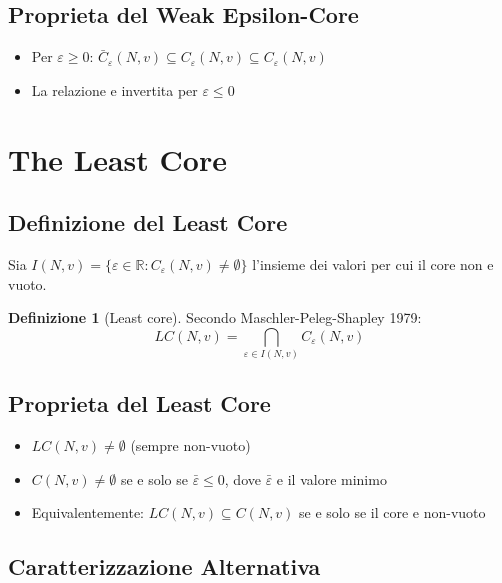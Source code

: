 \documentclass[12pt,a4paper]{article}
\theoremstyle{definition}
\newtheorem{definition}{Definizione}[section]
\begin{document}
\subsection*{Proprieta del Weak Epsilon-Core}

\begin{itemize}
    \item Per $\varepsilon \geq 0$: $\bar{C}_\varepsilon(N, v) \subseteq C_\varepsilon(N, v) \subseteq C_{\varepsilon}(N, v)$

    \item La relazione e invertita per $\varepsilon \leq 0$
\end{itemize}

\newpage

\section{The Least Core}

\subsection*{Definizione del Least Core}

Sia $I(N, v) = \{\varepsilon \in \mathbb{R} : C_\varepsilon(N, v) \neq \emptyset\}$ l'insieme dei valori per cui il core non e vuoto.

\begin{definition}[Least core]
Secondo Maschler-Peleg-Shapley 1979:
\[
LC(N, v) = \bigcap_{\varepsilon \in I(N, v)} C_\varepsilon(N, v)
\]
\]
\end{definition}

\subsection*{Proprieta del Least Core}

\begin{itemize}
    \item $LC(N, v) \neq \emptyset$ (sempre non-vuoto)

    \item $C(N, v) \neq \emptyset$ se e solo se $\bar{\varepsilon} \leq 0$, dove $\bar{\varepsilon}$ e il valore minimo

    \item Equivalentemente: $LC(N, v) \subseteq C(N, v)$ se e solo se il core e non-vuoto
\end{itemize}

\subsection*{Caratterizzazione Alternativa}
\end{document}
